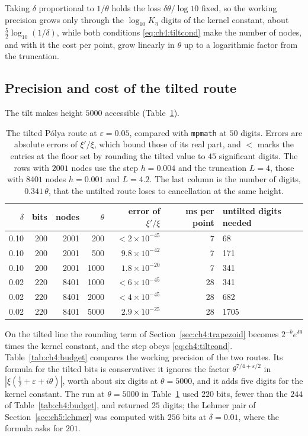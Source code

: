 Taking $\delta$ proportional to $1/\theta$ holds the loss $\delta\theta/\log10$ fixed, so the working precision grows only through the $\log_{10}K_\eta$ digits of the kernel constant, about $\frac52\log_{10}(1/\delta)$, while both conditions \eqref{eq:ch4:tiltcond} make the number of nodes, and with it the cost per point, grow linearly in $\theta$ up to a logarithmic factor from the truncation.

\subsection{Precision and cost of the tilted route}\label{sec:ch4:budget}

The tilt makes height $5000$ accessible (Table~\ref{tab:tilt}).

\begin{table}[t]
\centering\small
\begin{tabular}{rrrrrrl}
\toprule
$\delta$ & bits & nodes & $\theta$ & error of $\xi'/\xi$ & ms per point & untilted digits needed\\
\midrule
0.10 & 200 & 2001 & 200 & $<2\times10^{-45}$ & 7 & 68\\
0.10 & 200 & 2001 & 500 & $9.8\times10^{-42}$ & 7 & 171\\
0.10 & 200 & 2001 & 1000 & $1.8\times10^{-20}$ & 7 & 341\\
0.02 & 220 & 8401 & 1000 & $<6\times10^{-45}$ & 28 & 341\\
0.02 & 220 & 8401 & 2000 & $<4\times10^{-45}$ & 28 & 682\\
0.02 & 220 & 8401 & 5000 & $2.9\times10^{-25}$ & 28 & 1705\\
\bottomrule
\end{tabular}
\caption{The tilted P\'olya route at $\varepsilon=0.05$, compared with \texttt{mpmath} at $50$ digits. Errors are absolute errors of $\xi'/\xi$, which bound those of its real part, and $<$ marks the entries at the floor set by rounding the tilted value to $45$ significant digits. The rows with $2001$ nodes use the step $h=0.004$ and the truncation $L=4$, those with $8401$ nodes $h=0.001$ and $L=4.2$. The last column is the number of digits, $0.341\,\theta$, that the untilted route loses to cancellation at the same height.}
\label{tab:tilt}
\end{table}

On the tilted line the rounding term of Section~\ref{sec:ch4:trapezoid} becomes $2^{-b}e^{\delta\theta}$ times the kernel constant, and the step obeys \eqref{eq:ch4:tiltcond}. Table~\ref{tab:ch4:budget} compares the working precision of the two routes. Its formula for the tilted bits is conservative: it ignores the factor $\theta^{7/4+\varepsilon/2}$ in $|\xi(\tfrac12+\varepsilon+i\theta)|$, worth about six digits at $\theta=5000$, and it adds five digits for the kernel constant. The run at $\theta=5000$ in Table~\ref{tab:tilt} used $220$ bits, fewer than the $244$ of Table~\ref{tab:ch4:budget}, and returned $25$ digits; the Lehmer pair of Section~\ref{sec:ch5:lehmer} was computed with $256$ bits at $\delta=0.01$, where the formula asks for $201$.


